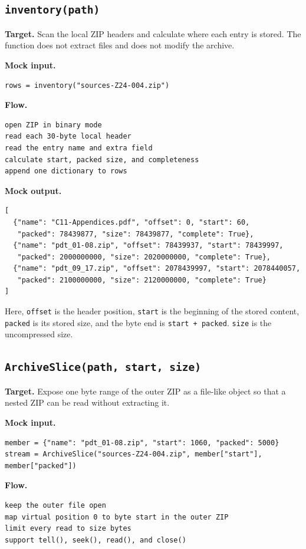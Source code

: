 \documentclass[11pt,a4paper]{article}
\begin{document}
\subsection{\texttt{inventory(path)}}
\textbf{Target.} Scan the local ZIP headers and calculate where each entry is stored. The function does not extract files and does not modify the archive.

\textbf{Mock input.}
\begin{lstlisting}
rows = inventory("sources-Z24-004.zip")
\end{lstlisting}

\textbf{Flow.}
\begin{lstlisting}
open ZIP in binary mode
read each 30-byte local header
read the entry name and extra field
calculate start, packed size, and completeness
append one dictionary to rows
\end{lstlisting}

\textbf{Mock output.}
\begin{lstlisting}
[
  {"name": "C11-Appendices.pdf", "offset": 0, "start": 60,
   "packed": 78439877, "size": 78439877, "complete": True},
  {"name": "pdt_01-08.zip", "offset": 78439937, "start": 78439997,
   "packed": 2000000000, "size": 2020000000, "complete": True},
  {"name": "pdt_09_17.zip", "offset": 2078439997, "start": 2078440057,
   "packed": 2100000000, "size": 2120000000, "complete": True}
]
\end{lstlisting}

Here, \texttt{offset} is the header position, \texttt{start} is the beginning of the stored content, \texttt{packed} is its stored size, and the byte end is \texttt{start + packed}. \texttt{size} is the uncompressed size.

\subsection{\texttt{ArchiveSlice(path, start, size)}}
\textbf{Target.} Expose one byte range of the outer ZIP as a file-like object so that a nested ZIP can be read without extracting it.

\textbf{Mock input.}
\begin{lstlisting}
member = {"name": "pdt_01-08.zip", "start": 1060, "packed": 5000}
stream = ArchiveSlice("sources-Z24-004.zip", member["start"], member["packed"])
\end{lstlisting}

\textbf{Flow.}
\begin{lstlisting}
keep the outer file open
map virtual position 0 to byte start in the outer ZIP
limit every read to size bytes
support tell(), seek(), read(), and close()
\end{lstlisting}
\end{document}
